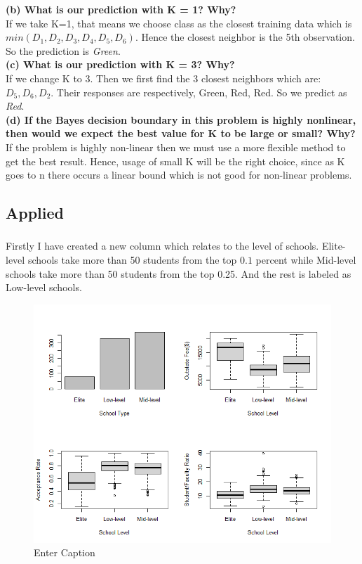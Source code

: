 \documentclass{article}
\begin{document}
\textbf{(b) What is our prediction with K = 1? Why? }\\

If we take K=1, that means we choose class as the closest training data which is $min(D_1,D_2,D_3,D_4,D_5,D_6)$. Hence the closest neighbor is the 5th observation. So the prediction is \textit{Green}. \\ 

\textbf{(c) What is our prediction with K = 3? Why? }\\

If we change K to 3. Then we first find the 3 closest neighbors which are: $D_5, D_6, D_2$. Their responses are respectively, Green, Red, Red. So we predict as \textit{Red}. \\

\textbf{(d) If the Bayes decision boundary in this problem is highly nonlinear, then would we expect the best value for K to be large or
small? Why?} \\

If the problem is highly non-linear then we must use a more flexible method to get the best result. Hence, usage of small K will be the right choice, since as K goes to n there occurs a linear bound which is not good for non-linear problems.

\subsection{Applied}
\subsubsection{}
Firstly I have created a new column which relates to the level of schools. Elite-level schools take more than 50 students from the top $0.1$ percent while Mid-level schools take more than 50 students from the top 0.25. And the rest is labeled as Low-level schools.
\begin{figure}[h]
    \centering
    \includegraphics[width=1\linewidth]{Rplot.png}
    \caption{Enter Caption}
    \label{fig:enter-label}
\end{figure}
\end{document}

